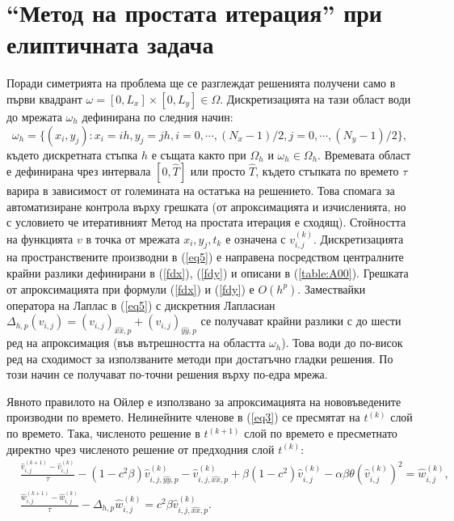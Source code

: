 \documentclass{article}
\newcommand{\rf}[1]{(\ref{#1})}
\begin{document}
\section{``Метод на простата итерация'' при елиптичната задача}
Поради симетрията на проблема ще се разглеждат решенията получени само в първи квадрант $\omega = [0,L_x] \times[0,L_y] \in \Omega$. Дискретизацията на тази област води до мрежата $\omega_h$ дефинирана по следния начин:
$$
\omega_h = \{(x_i,y_j): x_i = ih, y_j = jh, i = 0,\cdots ,(N_x-1)/2, j = 0,\cdots , (N_y-1)/2 \},
$$
където дискретната стъпка $h$ е същата както при $\Omega_h$ и $\omega_h \in \Omega_h$. Времевата област е дефинирана чрез интервала $[0, \widehat T]$ или просто $\widehat T$, където стъпката по времето $\tau$ варира в зависимост от големината на остатъка на решението. Това спомага за автоматизиране контрола върху грешката (от апроксимацията и изчисленията, но с условието че итеративният Метод на простата итерация е сходящ). Стойността на функцията $v$ в точка от мрежата $x_i,y_j,t_k$ е означена с $v_{i,j}^{(k)}$. 
Дискретизацията на пространствените производни в \rf{eq5} е направена посредством централните крайни разлики дефинирани в \rf{fdx}, \rf{fdy} и описани в \rf{table:A00}. Грешката от апроксимацията при формули \rf{fdx} и \rf{fdy} е $O(h^p)$. Замествайки оператора на Лаплас в \rf{eq5} с дискретния Лапласиан $\Delta_{h,p} (v_{i,j}) = (v_{i,j})_{\widehat{xx},p} + (v_{i,j})_{\widehat{yy},p}$ се получават крайни разлики с до шести ред на апроксимация (във вътрешността на областта $\omega_h$). Това води до по-висок ред на сходимост за използваните методи при достатъчно гладки решения. По този начин се получават по-точни решения върху по-едра мрежа. 
\par
Явното правилото на Ойлер е използвано за апроксимацията на нововъведените производни по времето. Нелинейните членове в \rf{eq3} се пресмятат на $t^{(k)}$ слой по времето. Така, численото решение в $t^{(k+1)}$ слой по времето е пресметнато директно чрез численото решение от предходния слой $t^{(k)}$:
\begin{equation}\label{eq55}
\begin{split}
&\frac {\widehat{v}_{i,j}^{(k+1)}-\widehat{v}_{i,j}^{(k)}}{\tau}- (1-c^2 \beta) \widehat{v}_{i,j,{\widehat{yy},p}}^{(k)} - \widehat{v}_{i,j,{\widehat{xx},p}}^{(k)} + \beta (1-c^2 ) \widehat{v}_{i,j}^{(k)} - \alpha \beta \theta (\widehat{v}_{i,j}^{(k)})^2 = \widehat{w}_{i,j}^{(k)}, \\
&\frac  {\widehat{w}_{i,j}^{(k+1)} -\widehat{w}_{i,j}^{(k)}} {\tau} - \Delta_{h,p} \widehat{w}_{i,j}^{(k)} =  c^2 \beta \widehat{v}_{i,j,{\widehat{xx},p}}^{(k)}.
\end{split}
\end{equation}
\end{document}
